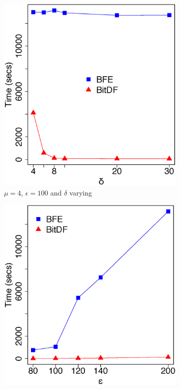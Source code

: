 \begin{figure}
    \centering
    \begin{subfigure}[t]{0.48\textwidth}
        \includegraphics[width=\textwidth]{images/Brinkhoff_n_4_g_200_varying_l.eps}
        \caption{$\mu = 4$, $\epsilon = 100$ and $\delta$ varying}
        \label{fig:brinkhoff_vary_l}
    \end{subfigure}
    \begin{subfigure}[t]{0.48\textwidth}
        \includegraphics[width=\textwidth]{images/Brinkhoff_n_4_l_8_varying_g.eps}

\end{subfigure}
\end{figure}
